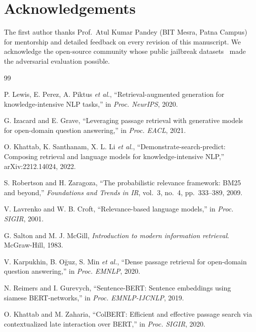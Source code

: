 \documentclass[conference]{IEEEtran}
\begin{document}
\section*{Acknowledgements}
The first author thanks Prof.~Atul Kumar Pandey (BIT Mesra, Patna
Campus) for mentorship and detailed feedback on every revision of
this manuscript.  We acknowledge the open-source community whose
public jailbreak datasets~\cite{greshake2023indirect,
shen2024dan, wallace2019triggers} made the adversarial evaluation
possible.


\begin{thebibliography}{99}

P. Lewis, E. Perez, A. Piktus \emph{et al.},
``Retrieval-augmented generation for knowledge-intensive NLP tasks,''
in \emph{Proc. NeurIPS}, 2020.

G. Izacard and E. Grave,
``Leveraging passage retrieval with generative models for
open-domain question answering,'' in \emph{Proc. EACL}, 2021.

O. Khattab, K. Santhanam, X. L. Li \emph{et al.},
``Demonstrate-search-predict: Composing retrieval and language
models for knowledge-intensive NLP,'' arXiv:2212.14024, 2022.

S. Robertson and H. Zaragoza,
``The probabilistic relevance framework: BM25 and beyond,''
\emph{Foundations and Trends in IR}, vol.~3, no.~4, pp.~333--389,
2009.

V. Lavrenko and W. B. Croft,
``Relevance-based language models,'' in \emph{Proc. SIGIR}, 2001.

G. Salton and M. J. McGill,
\emph{Introduction to modern information retrieval}.
McGraw-Hill, 1983.

V. Karpukhin, B. O\u{g}uz, S. Min \emph{et al.},
``Dense passage retrieval for open-domain question answering,''
in \emph{Proc. EMNLP}, 2020.

N. Reimers and I. Gurevych,
``Sentence-BERT: Sentence embeddings using siamese BERT-networks,''
in \emph{Proc. EMNLP-IJCNLP}, 2019.

O. Khattab and M. Zaharia,
``ColBERT: Efficient and effective passage search via contextualized
late interaction over BERT,'' in \emph{Proc. SIGIR}, 2020.


\end{thebibliography}
\end{document}
